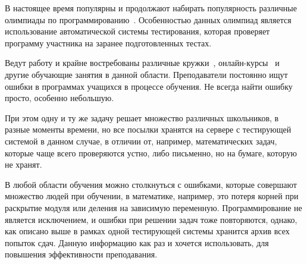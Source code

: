 \documentclass[times,specification,annotation]{itmo-student-thesis}
\begin{document}






\tableofcontents

\startprefacepage

В настоящее время популярны и продолжают набирать популярность различные олимпиады по программированию~\cite{rcc, ioip, codeforces-ru}.
Особенностью данных олимпиад является использование автоматической системы тестирования, которая проверяет
программу участника на заранее подготовленных тестах.

Ведут работу и крайне востребованы различные кружки~\cite{kalinin}, онлайн-курсы~\cite{i2cpx} 
и другие обучающие занятия в данной области.
Преподаватели постоянно ищут ошибки в программах учащихся в процессе обучения. Не всегда найти ошибку просто, 
особенно небольшую. 

При этом одну и ту же задачу решает множество различных школьников, в разные моменты времени, но все посылки
хранятся на сервере с тестирующей системой в данном случае, в отличии от, например, математических задач,
которые чаще всего проверяются устно, либо письменно, но на бумаге, которую не хранят.

В любой области обучения можно столкнуться с ошибками, которые совершают множество людей при обучении,
в математике, например, это потеря корней при раскрытие модуля или деления на зависимую переменную.
Программирование не является исключением, и ошибки при решении задач тоже повторяются, однако, как описано выше
в рамках одной тестирующей системы хранится архив всех попыток сдач. 
Данную информацию как раз и хочется использовать, для повышения эффективности преподавания.
\end{document}
